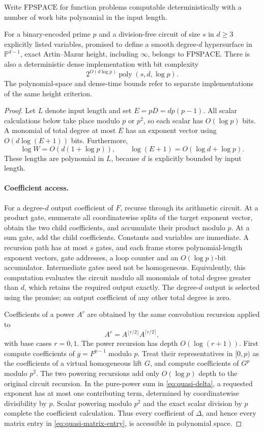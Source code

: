 Write $\mathrm{FPSPACE}$ for function problems computable deterministically
with a number of work bits polynomial in the input length.

\begin{theorem}
\label{thm:quasi-height-resource-bounds}
For a binary-encoded prime $p$ and a division-free circuit of size $s$
in $d\ge3$ explicitly listed variables, promised to define a smooth
degree-$d$ hypersurface in $\mathbb P^{d-1}$, exact Artin--Mazur height,
including $\infty$, belongs to $\mathrm{FPSPACE}$.
There is also a deterministic dense implementation with bit complexity
\[
 2^{O(d\log p)}\operatorname{poly}(s,d,\log p).
\]
The polynomial-space and dense-time bounds refer to separate
implementations of the same height criterion.
\end{theorem}
\begin{proof}
Let $L$ denote input length and set $E=pD=dp(p-1)$. All scalar
calculations below take place modulo $p$ or $p^2$, so each scalar has
$O(\log p)$ bits. A monomial of total degree at most $E$ has an exponent
vector using $O(d\log(E+1))$ bits. Furthermore,
\[
 \log W=O(d(1+\log p)),\qquad
 \log(E+1)=O(\log d+\log p).
\]
These lengths are polynomial in $L$, because $d$ is explicitly bounded
by input length.

\paragraph{Coefficient access.}
For a degree-$d$ output coefficient of $F$, recurse through its arithmetic
circuit. At a product gate, enumerate all coordinatewise splits of the
target exponent vector, obtain the two child coefficients, and accumulate
their product modulo $p$. At a sum gate, add the child coefficients.
Constants and variables are immediate. A recursion path has at most $s$
gates, and each frame stores polynomial-length exponent vectors, gate
addresses, a loop counter and an $O(\log p)$-bit accumulator. Intermediate
gates need not be homogeneous. Equivalently, this computation evaluates
the circuit modulo all monomials of total degree greater than $d$, which
retains the required output exactly. The degree-$d$ output is selected
using the promise; an output coefficient of any other total degree is zero.

Coefficients of a power $A^r$ are obtained by the same convolution
recursion applied to
\[
 A^r=A^{\lfloor r/2\rfloor}A^{\lceil r/2\rceil},
\]
with base cases $r=0,1$. The power recursion has depth
$O(\log(r+1))$. First compute coefficients of $g=F^{p-1}$ modulo $p$.
Treat their representatives in $[0,p)$ as the coefficients of a virtual
homogeneous lift $G$, and compute coefficients of $G^p$ modulo $p^2$.
The two powering recursions add only $O(\log p)$ depth to the original
circuit recursion. In the pure-power sum in \eqref{eq:quasi-delta}, a
requested exponent has at most one contributing term, determined by
coordinatewise divisibility by $p$. Scalar powering modulo $p^2$ and
the exact scalar division by $p$ complete the coefficient calculation.
Thus every coefficient of $\Delta$, and hence every matrix entry in
\eqref{eq:quasi-matrix-entry}, is accessible in polynomial space.


\end{proof}
